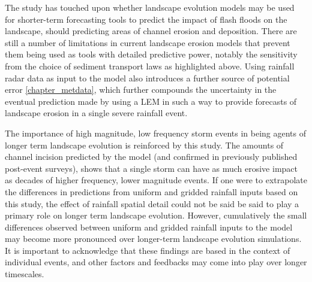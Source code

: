 The study has touched upon whether landscape evolution models may be used for shorter-term forecasting tools to predict the impact of flash floods on the landscape, should predicting areas of channel erosion and deposition. There are still a number of limitations in current landscape erosion models that prevent them being used as tools with detailed predictive power, notably the sensitivity from the choice of sediment transport laws as highlighted above. Using rainfall radar data as input to the model also introduces a further source of potential error \ref{chapter_metdata}, which further compounds the uncertainty in the eventual prediction made by using a LEM in such a way to provide forecasts of landscape erosion in a single severe rainfall event. 

The importance of high magnitude, low frequency storm events in being agents of longer term landscape evolution is reinforced by this study. The amounts of channel incision predicted by the model (and confirmed in previously published post-event surveys), shows that a single storm can have as much erosive impact as decades of higher frequency, lower magnitude events. If one were to extrapolate the differences in predictions from uniform and gridded rainfall inputs based on this study, the effect of rainfall spatial detail could not be said be said to play a primary role on longer term landscape evolution. However, cumulatively the small differences observed between uniform and gridded rainfall inputs to the model may become more pronounced over longer-term landscape evolution simulations. It is important to acknowledge that these findings are based in the context of individual events, and other factors and feedbacks may come into play over longer timescales.









